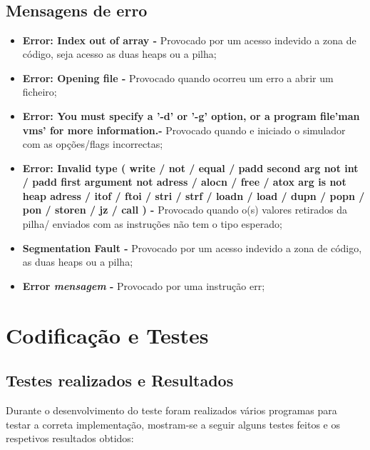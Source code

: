 \documentclass{report}
\begin{document}
\null\\
\null\\
\null\\
\null\\
\null\\
\null\\
\null\\
\null\\
\null\\
\section{Mensagens de erro}

\begin{itemize}
\item \textbf{Error: Index out of array - } Provocado por um acesso indevido a zona de código, seja acesso as duas heaps ou a pilha;
\item \textbf{Error: Opening file - } Provocado quando ocorreu um erro a abrir um ficheiro;
\item \textbf{Error: You must specify a '-d' or '-g' option, or a program file\nTry 'man vms' for more information.\n - } Provocado quando e iniciado o simulador
com as opções/flags incorrectas;
\item \textbf{Error: Invalid type ( write / not / equal / padd second arg not int / padd first argument not adress / alocn / free /
 atox arg is not heap adress / itof / ftoi / stri / strf / loadn / load / dupn / popn / pon / storen / jz / call ) - } Provocado
 quando o(s) valores retirados da pilha/ enviados com as instruções não tem o tipo esperado;
\item \textbf{Segmentation Fault - } Provocado por um acesso indevido a zona de código, as duas heaps ou a pilha;
\item \textbf{Error \textit{mensagem} - } Provocado por uma instrução err;
\end{itemize}

\chapter{Codificação e Testes}

\section{Testes realizados e Resultados}
Durante o desenvolvimento do teste foram realizados vários programas para testar a correta implementação, mostram-se
a seguir alguns testes feitos e os respetivos resultados obtidos:\\
\end{document}
